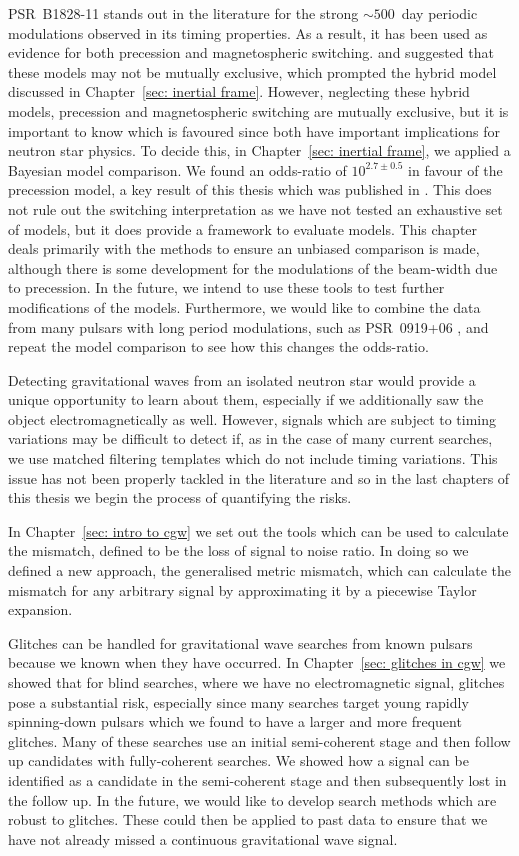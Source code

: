 \documentclass[twoside, 11pt]{thesis}
\begin{document}
PSR~B1828-11 stands out in the literature for the strong $\sim 500$~day
periodic modulations observed in its timing properties. As a result, it has
been used as evidence for both precession and magnetospheric switching.
\citet{Jones2001} and \citet{Cordes2013} suggested that these models may not be
mutually exclusive, which prompted the hybrid model discussed in
Chapter~\ref{sec: inertial frame}. However, neglecting these hybrid models,
precession and magnetospheric switching are mutually exclusive, but it is
important to know which is favoured since both have important implications for
neutron star physics. To decide this, in Chapter~\ref{sec: inertial frame}, we
applied a Bayesian model comparison. We found an odds-ratio of $10^{2.7\pm
0.5}$ in favour of the precession model, a key result of this thesis which was
published in \citet{Ashton2016}. This does not rule out the switching
interpretation as we have not tested an exhaustive set of models, but it does
provide a framework to evaluate models. This chapter deals primarily with the
methods to ensure an unbiased comparison is made, although there is some
development for the modulations of the beam-width due to precession. In
the future, we intend to use these tools to test further modifications of the
models. Furthermore, we would like to combine the data from many pulsars with
long period modulations, such as PSR~0919+06 \citep{Perera2014}, and repeat the
model comparison to see how this changes the odds-ratio.

Detecting gravitational waves from an isolated neutron star would provide a
unique opportunity to learn about them, especially if we additionally saw the
object electromagnetically as well. However, signals which are subject to
timing variations may be difficult to detect if, as in the case of many current
searches, we use matched filtering templates which do not include timing
variations. This issue has not been properly tackled in the literature and so
in the last chapters of this thesis we begin the process of quantifying the
risks.

In Chapter~\ref{sec: intro to cgw} we set out the tools which can be used to
calculate the mismatch, defined to be the loss of signal to noise ratio. In
doing so we defined a new approach, the generalised metric mismatch, which can
calculate the mismatch for any arbitrary signal by approximating it by a
piecewise Taylor expansion.

Glitches can be handled for gravitational wave searches from known pulsars
because we known when they have occurred. In Chapter~\ref{sec: glitches in cgw}
we showed that for blind searches, where we have no electromagnetic signal,
glitches pose a substantial risk, especially since many searches target young
rapidly spinning-down pulsars which we found to have a larger and more frequent
glitches. Many of these searches use an initial semi-coherent stage and then
follow up candidates with fully-coherent searches.  We showed how a signal can
be identified as a candidate in the semi-coherent stage and then subsequently
lost in the follow up. In the future, we would like to develop search methods
which are robust to glitches. These could then be applied to past data to
ensure that we have not already missed a continuous gravitational wave signal.
\end{document}
